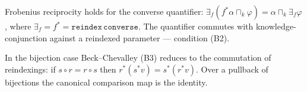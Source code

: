 \begin{theorem}\label{thm:converse-frobenius}\leanok{}
Frobenius reciprocity holds for the converse quantifier:
$\exists_{f}(f^{*}\alpha \sqcap_k \varphi) = \alpha \sqcap_k \exists_{f}\varphi$,
where $\exists_{f} = f^{*} = \texttt{reindex}\,\texttt{converse}$. The quantifier
commutes with knowledge-conjunction against a reindexed parameter --- condition
(B2).
\end{theorem}
\begin{theorem}\label{thm:beck-chevalley}\leanok{}
In the bijection case Beck--Chevalley (B3) reduces to the commutation of
reindexings: if $s\circ r = r\circ s$ then $r^{*}(s^{*}v) = s^{*}(r^{*}v)$. Over
a pullback of bijections the canonical comparison map is the identity.
\end{theorem}
